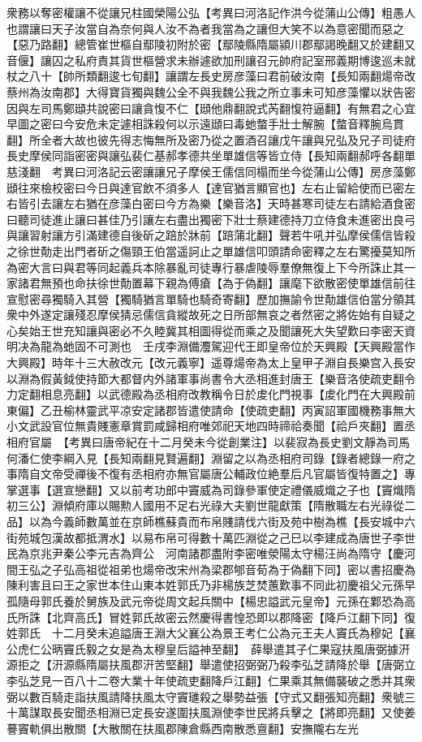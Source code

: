 衆務以奪密權讓不從讓兄柱國榮陽公弘【考異曰河洛記作洪今從蒲山公傳】粗愚人也謂讓曰天子汝當自為奈何與人汝不為者我當為之讓但大笑不以為意密聞而惡之【惡乃路翻】總管崔世樞自鄢陵初附於密【鄢陵縣隋屬潁川郡鄢謁晚翻又於建翻又音偃】讓囚之私府責其貨世樞營求未辦遽欲加刑讓召元帥府記室邢義期博逡巡未就杖之八十【帥所類翻逡七旬翻】讓謂左長史房彦藻曰君前破汝南【長知兩翻煬帝改蔡州為汝南郡】大得寶貨獨與魏公全不與我魏公我之所立事未可知彦藻懼以狀告密因與左司馬鄭頲共說密曰讓貪愎不仁【頲他鼎翻說式芮翻愎符逼翻】有無君之心宜早圖之密曰今安危未定遽相誅殺何以示遠頲曰毒虵螫手壯士解腕【螫音釋腕烏貫翻】所全者大故也彼先得志悔無所及密乃從之置酒召讓戊午讓與兄弘及兄子司徒府長史摩侯同詣密密與讓弘裴仁基郝孝德共坐單雄信等皆立侍【長知兩翻郝呼各翻單慈淺翻　考異曰河洛記云密讓讓兄子摩侯王儒信同榻而坐今從蒲山公傳】房彦藻鄭頲往來檢校密曰今日與達官飲不須多人【達官猶言顯官也】左右止留給使而已密左右皆引去讓左右猶在彦藻白密曰今方為樂【樂音洛】天時甚寒司徒左右請給酒食密曰聽司徒進止讓曰甚佳乃引讓左右盡出獨密下壯士蔡建德持刀立侍食未進密出良弓與讓習射讓方引滿建德自後斫之踣於牀前【踣蒲北翻】聲若牛吼并弘摩侯儒信皆殺之徐世勣走出門者斫之傷頸王伯當遥訶止之單雄信叩頭請命密釋之左右驚擾莫知所為密大言曰與君等同起義兵本除暴亂司徒專行暴虐陵辱羣僚無復上下今所誅止其一家諸君無預也命扶徐世勣置幕下親為傅瘡【為于偽翻】讓麾下欲散密使單雄信前往宣慰密尋獨騎入其營【獨騎猶言單騎也騎奇寄翻】歷加撫諭令世勣雄信伯當分領其衆中外遂定讓殘忍摩侯猜忌儒信貪縱故死之日所部無哀之者然密之將佐始有自疑之心矣始王世充知讓與密必不久睦冀其相圖得從而乘之及聞讓死大失望歎曰李密天資明决為龍為虵固不可測也　壬戌李淵備灋駕迎代王即皇帝位於天興殿【天興殿當作大興殿】時年十三大赦改元【改元義寧】遥尊煬帝為太上皇甲子淵自長樂宫入長安以淵為假黃鉞使持節大都督内外諸軍事尚書令大丞相進封唐王【樂音洛使疏吏翻令力定翻相息亮翻】以武德殿為丞相府改教稱令日於䖍化門視事【䖍化門在大興殿前東偏】乙丑榆林靈武平凉安定諸郡皆遣使請命【使疏吏翻】丙寅詔軍國機務事無大小文武設官位無貴賤憲章賞罰咸歸相府唯郊祀天地四時禘祫奏聞【祫戶夾翻】置丞相府官屬　【考異曰唐帝紀在十二月癸未今從創業注】以裴寂為長史劉文靜為司馬何潘仁使李綱入見【長知兩翻見賢遍翻】淵留之以為丞相府司錄【錄者總錄一府之事隋自文帝受禪後不復有丞相府亦無官屬唐公輔政位絶羣后凡官屬皆復特置之】專掌選事【選宣戀翻】又以前考功郎中竇威為司錄參軍使定禮儀威熾之子也【竇熾隋初三公】淵傾府庫以賜勲人國用不足右光祿大夫劉世龍獻策【隋散職左右光祿從二品】以為今義師數萬並在京師樵蘇貴而布帛賤請伐六街及苑中樹為樵【長安城中六街苑城包漢故都抵渭水】以易布帛可得數十萬匹淵從之己巳以李建成為唐世子李世民為京兆尹秦公李元吉為齊公　河南諸郡盡附李密唯滎陽太守楊汪尚為隋守【慶河間王弘之子弘高祖從祖弟也煬帝改宋州為梁郡郇音荀為于偽翻下同】密以書招慶為陳利害且曰王之家世本住山東本姓郭氏乃非楊族芝焚蕙歎事不同此初慶祖父元孫早孤隨母郭氏養於舅族及武元帝從周文起兵關中【楊忠謚武元皇帝】元孫在鄴恐為高氏所誅【北齊高氏】冒姓郭氏故密云然慶得書惶恐即以郡降密【降戶江翻下同】復姓郭氏　十二月癸未追謚唐王淵大父襄公為景王考仁公為元王夫人竇氏為穆妃【襄公虎仁公昞竇氏毅之女是為太穆皇后謚神至翻】　薛舉遣其子仁果寇扶風唐弼據汧源拒之【汧源縣隋屬扶風郡汧苦堅翻】舉遣使招弼弼乃殺李弘芝請降於舉【唐弼立李弘芝見一百八十二卷大業十年使疏吏翻降戶江翻】仁果乘其無備襲破之悉并其衆弼以數百騎走詣扶風請降扶風太守竇璡殺之舉勢益張【守式又翻張知亮翻】衆號三十萬謀取長安聞丞相淵已定長安遂圍扶風淵使李世民將兵擊之【將即亮翻】又使姜謩竇軌俱出散關【大散關在扶風郡陳倉縣西南散悉亶翻】安撫隴右左光